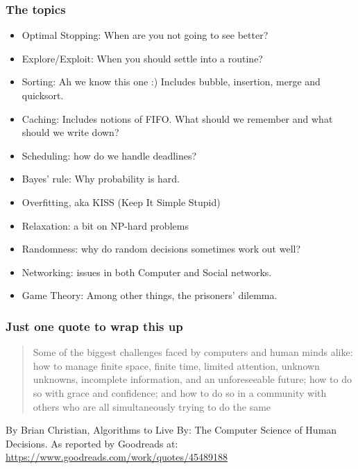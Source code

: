 \begin{frame}
	\frametitle{The topics}
	\begin{itemize}
		\item Optimal Stopping: When are you not going to see better?
			\pause
		\item Explore/Exploit: When you should settle into a routine?
			\pause
		\item Sorting: Ah we know this one :) Includes bubble, insertion, merge and quicksort.
			\pause
		\item Caching: Includes notions of FIFO. What should we remember and what should we write down?
			\pause
		\item Scheduling: how do we handle deadlines?
			\pause
		\item Bayes' rule: Why probability is hard.
			\pause
		\item Overfitting, aka KISS (Keep It Simple Stupid)
			\pause
		\item Relaxation: a bit on NP-hard problems
			\pause
		\item Randomness: why do random decisions sometimes work out well?
			\pause
		\item Networking: issues in both Computer and Social networks.
			\pause
		\item Game Theory: Among other things, the prisoners' dilemma.
	\end{itemize}
\end{frame}

\begin{frame}
	\frametitle{Just one quote to wrap this up}
	
	\begin{quote}
		Some of the biggest challenges faced by computers and human minds alike: how to manage finite space, finite time, limited attention, unknown unknowns, incomplete information, and an unforeseeable future; how to do so with grace and confidence; and how to do so in a community with others who are all simultaneously trying to do the same
	\end{quote}
	By Brian Christian, Algorithms to Live By: The Computer Science of Human Decisions. As reported by Goodreads at:
	\url{https://www.goodreads.com/work/quotes/45489188}
\end{frame}


